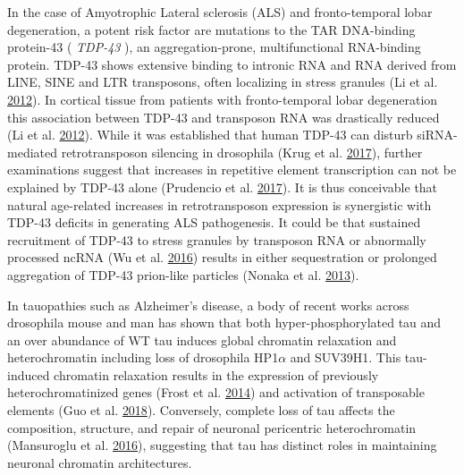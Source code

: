 \documentclass[onehalf,12pt]{beavtex}
\begin{document}
  In the case of Amyotrophic Lateral sclerosis (ALS) and fronto-temporal
  lobar degeneration, a potent risk factor are mutations to the TAR
  DNA-binding protein-43 ( \emph{TDP-43} ), an aggregation-prone,
  multifunctional RNA-binding protein. TDP-43 shows extensive binding to
  intronic RNA and RNA derived from LINE, SINE and LTR transposons, often
  localizing in stress granules (Li et al.
  \protect\hyperlink{ref-LiTransposableelementsTDP43mediated2012}{2012}).
  In cortical tissue from patients with fronto-temporal lobar degeneration
  this association between TDP-43 and transposon RNA was drastically
  reduced (Li et al.
  \protect\hyperlink{ref-LiTransposableelementsTDP43mediated2012}{2012}).
  While it was established that human TDP-43 can disturb siRNA-mediated
  retrotransposon silencing in drosophila (Krug et al.
  \protect\hyperlink{ref-KrugRetrotransposonactivationcontributes2017a}{2017}),
  further examinations suggest that increases in repetitive element
  transcription can not be explained by TDP-43 alone (Prudencio et al.
  \protect\hyperlink{ref-PrudencioRepetitiveelementtranscripts2017}{2017}).
  It is thus conceivable that natural age-related increases in
  retrotransposon expression is synergistic with TDP-43 deficits in
  generating ALS pathogenesis. It could be that sustained recruitment of
  TDP-43 to stress granules by transposon RNA or abnormally processed
  ncRNA (Wu et al.
  \protect\hyperlink{ref-WuUnusualProcessingGenerates2016}{2016}) results
  in either sequestration or prolonged aggregation of TDP-43 prion-like
  particles (Nonaka et al.
  \protect\hyperlink{ref-NonakaPrionlikePropertiesPathological2013}{2013}).
  
  In tauopathies such as Alzheimer's disease, a body of recent works
  across drosophila mouse and man has shown that both hyper-phosphorylated
  tau and an over abundance of WT tau induces global chromatin relaxation
  and heterochromatin including loss of drosophila HP1\(\alpha\) and
  SUV39H1. This tau-induced chromatin relaxation results in the expression
  of previously heterochromatinized genes (Frost et al.
  \protect\hyperlink{ref-FrostTaupromotesneurodegeneration2014}{2014}) and
  activation of transposable elements (Guo et al.
  \protect\hyperlink{ref-GuoTauActivatesTransposable2018}{2018}).
  Conversely, complete loss of tau affects the composition, structure, and
  repair of neuronal pericentric heterochromatin (Mansuroglu et al.
  \protect\hyperlink{ref-MansurogluLossTauprotein2016}{2016}), suggesting
  that tau has distinct roles in maintaining neuronal chromatin
  architectures.
  
\end{document}
